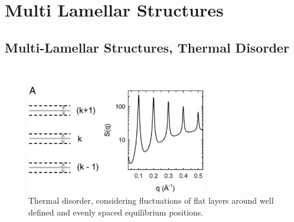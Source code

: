 
\clearpage
\section{Multi Lamellar Structures}
\subsection{Multi-Lamellar Structures, Thermal Disorder} \hspace{1pt}\\

\begin{figure}[htb]
\begin{center}
\includegraphics[width=0.7\textwidth,height=0.4\textwidth]{ThermalDisorderSQ.png}
\end{center}
\caption{Thermal disorder, considering fluctuations of flat layers
around well defined and evenly spaced equilibrium positions.}
\label{ThermalDisorderSQ}
\end{figure}

